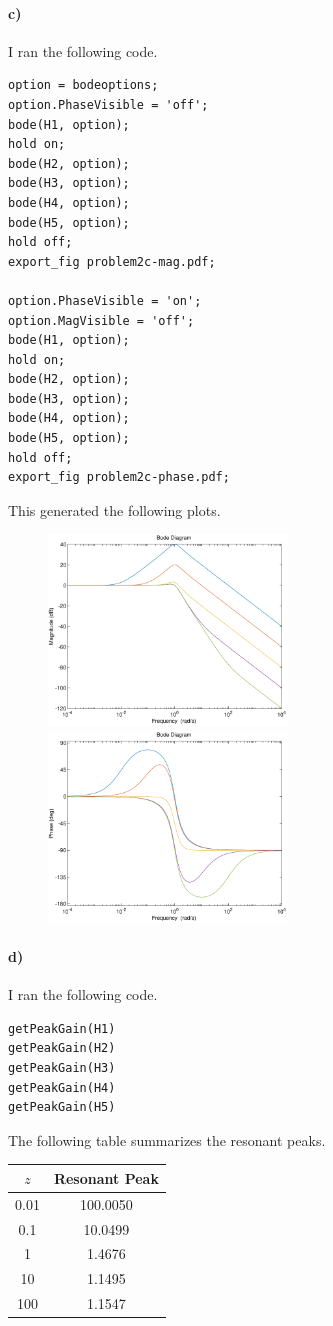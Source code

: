 \documentclass[12pt]{article}
\begin{document}
\paragraph{c)}

I ran the following code.
\begin{verbatim}
option = bodeoptions;
option.PhaseVisible = 'off';
bode(H1, option);
hold on;
bode(H2, option);
bode(H3, option);
bode(H4, option);
bode(H5, option);
hold off;
export_fig problem2c-mag.pdf;

option.PhaseVisible = 'on';
option.MagVisible = 'off';
bode(H1, option);
hold on;
bode(H2, option);
bode(H3, option);
bode(H4, option);
bode(H5, option);
hold off;
export_fig problem2c-phase.pdf;
\end{verbatim}
This generated the following plots.
\begin{figure}[H]
    \begin{center}
        \includegraphics[width=2.5in]{problem2c-mag.pdf}
        \includegraphics[width=2.5in]{problem2c-phase.pdf}
    \end{center}
\end{figure}

\paragraph{d)}

I ran the following code.
\begin{verbatim}
getPeakGain(H1)
getPeakGain(H2)
getPeakGain(H3)
getPeakGain(H4)
getPeakGain(H5)
\end{verbatim}
The following table summarizes the resonant peaks.
\begin{center}
    \begin{tabular}{c|c}
        \(z\) & Resonant Peak\\
        \hline
        0.01 & 100.0050\\
        0.1 & 10.0499\\
        1 & 1.4676\\
        10 & 1.1495\\
        100 & 1.1547
    \end{tabular}
\end{center}
\end{document}
